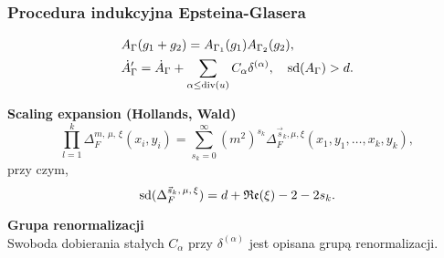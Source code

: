 \documentclass[10pt,t]{beamer}
\begin{document}
\begin{frame}
  \frametitle{Procedura indukcyjna Epsteina-Glasera}


  \begin{subequations}
    \begin{align}
      \label{eq:Epstein-Glaser-28-A}
      &A_{ \Gamma }( g _{ 1 } + g_{ 2 } ) =
        A_{ \Gamma_{ 1 } }( g _{ 1 } ) A_{ \Gamma_{ 2 } }( g_{ 2 } ), \\
      \label{eq:Epstein-Glaser-28-B}
      &\dot{ A }_{ \Gamma }' =
        \dot{ A }_{ \Gamma }
        + \sum\limits_{ \alpha \leq \textrm{div}( u ) } C_{ \alpha } \delta^{ ( \alpha ) }, \quad
        \textrm{sd}( A_{ \Gamma } ) > d.
    \end{align}
  \end{subequations}

  \textbf{Scaling expansion (Hollands, Wald)} \\
  \begin{equation}
    \label{eq:Epstein-Glaser-29}
    \prod_{ l = 1 }^{ k } \Delta_{ F }^{ m,\, \mu,\, \xi }( x_{ i }, y_{ i } ) =
    \sum_{ s_{ k } = 0 }^{ \infty } ( m^{ 2 } )^{ s_{ k } }
    \Delta_{ F }^{ \vec{ s }_{ k }, \mu, \xi }( x_{ 1 }, y_{ 1 }, \ldots,
    x_{ k }, y_{ k } ),
  \end{equation}
  przy czym,
  \begin{equation}
    \label{eq:Epstein-Glaser-30}
    \textrm{sd}( \Delta_{ F }^{ \vec{ s }_{ k },\, \mu,\, \xi } ) =
    d + \operatorname{\mathfrak{Re}}( \xi ) - 2 - 2 s_{ k }.
  \end{equation}

  \textbf{Grupa renormalizacji} \\
  Swoboda dobierania stałych $C_{ \alpha }$ przy
  $\delta^{ ( \alpha ) }$ jest opisana grupą renormalizacji.

\end{frame}
\end{document}
